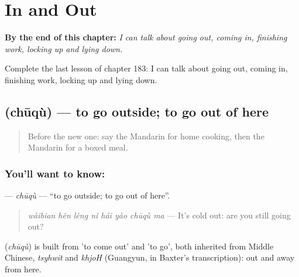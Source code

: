 
\chapter{In and Out}
\label{ch:zh-in-and-out}

\begin{chapteropening}
\textbf{By the end of this chapter:} \emph{I can talk about going out, coming in, finishing work, locking up and lying down.}

Complete the last lesson of chapter 183: I can talk about going out, coming in, finishing work, locking up and lying down.
\end{chapteropening}

\section[\texorpdfstring{\zh{出去} (chūqù)}{出去 (chūqù)}]{ (chūqù) — to go outside; to go out of here}

\label{lesson:ZH-C183-chuqu}



\begin{quote}
Before the new one: say the Mandarin for home cooking, then the Mandarin for a boxed meal.
\end{quote}

\subsection*{You'll want to know: }
\textbf{} — \emph{chūqù} — \textquotedblleft{}to go outside; to go out of here\textquotedblright{}.

\begin{quote}
\textbf{} \emph{wàibian hěn lěng nǐ hái yào chūqù ma} — It's cold out: are you still going out?
\end{quote}

\begin{cousinweb}
\textbf{} (\emph{chūqù}) is built from  'to come out' and  'to go', both inherited from Middle Chinese, \emph{tsyhwit} and \emph{khjoH} (Guangyun, in Baxter's transcription): out and away from here.
\end{cousinweb}


